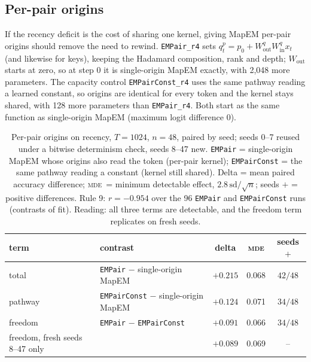 \documentclass[10pt]{article}
\newcommand{\mde}{\textsc{mde}}
\newcommand{\arm}[1]{\texttt{#1}}
\begin{document}
\subsection{Per-pair origins}
\label{sec:c4-pair}

If the recency deficit is the cost of sharing one kernel, giving MapEM per-pair origins should remove
the need to rewind. \arm{EMPair\_r4} sets $q^p_t=p_0+W^q_{\mathrm{out}}W^q_{\mathrm{in}}x_t$ (and likewise
for keys), keeping the Hadamard composition, rank and depth; $W_{\mathrm{out}}$ starts at zero, so at step
0 it is single-origin MapEM exactly, with 2,048 more parameters. The capacity control
\arm{EMPairConst\_r4} uses the same pathway reading a learned constant, so origins are identical for every
token and the kernel stays shared, with 128 more parameters than \arm{EMPair\_r4}. Both start as the same
function as single-origin MapEM (maximum logit difference 0). %

\begin{table}[t]
\centering
\small
\captionsetup{font=footnotesize,skip=4pt}
\caption{Per-pair origins on recency, $T=1024$, $n=48$, paired by seed; seeds 0--7 reused under a bitwise determinism check, seeds 8--47 new. \arm{EMPair} = single-origin MapEM whose origins also read the token (per-pair kernel); \arm{EMPairConst} = the same pathway reading a constant (kernel still shared). Delta = mean paired accuracy difference; \mde\ = minimum detectable effect, $2.8\,\mathrm{sd}/\sqrt{n}$; seeds $+$ = positive differences. Rule 9: $r=-0.954$ over the 96 \arm{EMPair} and \arm{EMPairConst} runs (contrasts of fit). Reading: all three terms are detectable, and the freedom term replicates on fresh seeds.}
\label{tab:pairsplit}
\begin{tabular}{@{}llccc@{}}
\toprule
term & contrast & delta & \mde & seeds $+$ \\
\midrule
total   & \arm{EMPair} $-$ single-origin MapEM      & $+0.215$ & 0.068 & $42/48$ \\
pathway & \arm{EMPairConst} $-$ single-origin MapEM & $+0.124$ & 0.071 & $34/48$ \\
freedom & \arm{EMPair} $-$ \arm{EMPairConst}       & $+0.091$ & 0.066 & $34/48$ \\
freedom, fresh seeds 8--47 only & & $+0.089$ & 0.069 & -- \\
\bottomrule
\end{tabular}
\end{table}
\end{document}
